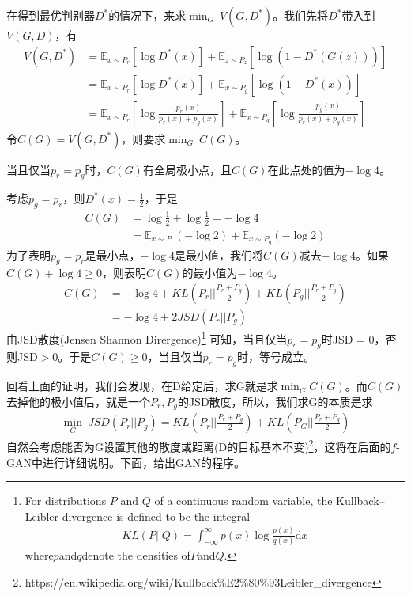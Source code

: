             \par
            在得到最优判别器$D^*$的情况下，来求$\min_G\ V(G,D^*)$。我们先将$D^*$带入到$V(G,D)$，有
            \begin{align*}
            V(G,D^*) &= \mathbb{E}_{x\sim P_r}[\log D^*(x)] + \mathbb{E}_{z\sim P_z}[\log (1-D^*(G(z)))]\\
            &=\mathbb{E}_{x\sim P_r}[\log D^*(x)]+\mathbb{E}_{x\sim P_g}[\log (1-D^*(x))]\\
            &=\mathbb{E}_{x\sim P_r} \left[ \log \frac{p_r(x)}{p_r(x)+p_g(x)} \right] + \mathbb{E}_{x\sim P_g} \left[\log \frac{p_g(x)}{p_r(x)+p_g(x)}   \right]
            \end{align*}
            令$C(G) = V(G,D^*)$，则要求$\min_G\ C(G)$。
            \begin{theorem}
            当且仅当$p_r = p_g$时，$C(G)$有全局极小点，且$C(G)$在此点处的值为$-\log 4$。
            \end{theorem}
            \begin{Proof}
            考虑$p_g = p_r$，则$D^*(x) = \frac{1}{2}$，于是
            \begin{align*}
            C(G) & = \log \frac{1}{2}+\log \frac{1}{2} = -\log 4\\
            & = \mathbb{E}_{x\sim P_r}(-\log 2)+\mathbb{E}_{x\sim P_g}(-\log 2)
            \end{align*}
            为了表明$p_g = p_r$是最小点，$-\log 4$是最小值，我们将$C(G)$减去$-\log 4$。如果$C(G)+\log 4 \geqslant 0$，则表明$C(G)$的最小值为$-\log 4$。
            \begin{align*}
            C(G) & = -\log 4 + KL \left( P_r\Big|\Big| \frac{P_r+P_g}{2} \right) + KL \left( P_g\Big|\Big| \frac{P_r+P_g}{2} \right) \\
            & = -\log 4+ 2JSD(P_r||P_g)
            \end{align*}
            由JSD散度(Jensen Shannon Dirergence)\footnote{For distributions $P$ and $Q$ of a continuous random variable, the Kullback–Leibler divergence is defined to be the integral
            \begin{align*}
            KL(P||Q) = \int_{-\infty}^\infty p(x) \log \frac{p(x)}{q(x)}\mathrm{d}x
            \end{align*}
            where$ p $and$ q $denote the densities of$ P $and$ Q$.
             }
            可知，当且仅当$p_r = p_g$时JSD = 0，否则JSD$>0$。于是$C(G) \geqslant 0$，当且仅当$p_r = p_g$时，等号成立。
            \end{Proof}
            \par
            回看上面的证明，我们会发现，在D给定后，求G就是求$\min _G C(G)$。而$C(G)$去掉他的极小值后，就是一个$P_r,P_g$的JSD散度，所以，我们求G的本质是求
            \begin{align*}
            \min _G\ JSD(P_r||P_g) = KL \left( P_r\Big|\Big| \frac{P_r+P_g}{2} \right) + KL \left( P_G\Big|\Big| \frac{P_r+P_g}{2} \right)
            \end{align*}
            自然会考虑能否为G设置其他的散度或距离(D的目标基本不变)\footnote{https://en.wikipedia.org/wiki/Kullback\%E2\%80\%93Leibler\_divergence}，这将在后面的$f$-GAN中进行详细说明。下面，给出GAN的程序。
